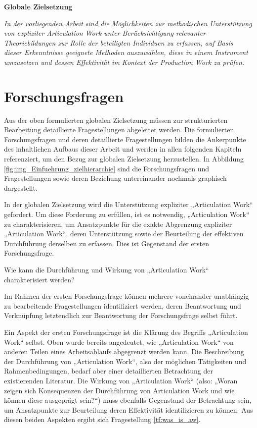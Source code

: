 \begin{framed}
	\label{zielsetzung}\textbf{Globale Zielsetzung} 
	
	\emph{In der vorliegenden Arbeit sind die Möglichkeiten zur methodischen Unterstützung von expliziter Articulation Work unter Berücksichtigung relevanter Theoriebildungen zur Rolle der beteiligten Individuen zu erfassen, auf Basis dieser Erkenntnisse geeignete Methoden auszuwählen, diese in einem Instrument umzusetzen und dessen Effektivität im Kontext der Production Work zu prüfen.}
\end{framed}


\section{Forschungsfragen} %
\label{sec:forschungsfragen}

Aus der oben formulierten globalen Zielsetzung müssen zur strukturierten Bearbeitung detaillierte Fragestellungen abgeleitet werden. Die formulierten Forschungsfragen und deren detaillierte Fragestellungen bilden die Ankerpunkte des inhaltlichen Aufbaus dieser Arbeit und werden in allen folgenden Kapiteln referenziert, um den Bezug zur globalen Zielsetzung herzustellen. In Abbildung \ref{fig:img_Einfuehrung_zielhierarchie} sind die Forschungsfragen und Fragestellungen sowie deren Beziehung untereinander nochmals graphisch dargestellt.

In der globalen Zielsetzung wird die Unterstützung expliziter „Articulation Work“ gefordert. Um diese Forderung zu erfüllen, ist es notwendig, „Articulation Work“ zu charakterisieren, um Ansatzpunkte für die exakte Abgrenzung expliziter „Articulation Work“, deren Unterstützung sowie der Beurteilung der effektiven Durchführung derselben zu erfassen. Dies ist Gegenstand der ersten Forschungsfrage. 

\begin{ff}
	\label{ff:beschreibung}
	Wie kann die Durchführung und Wirkung von „Articulation Work“ charakterisiert werden?
\end{ff}

Im Rahmen der ersten Forschungsfrage können mehrere voneinander unabhängig zu bearbeitende Fragestellungen identifiziert werden, deren Beantwortung und Verknüpfung letztendlich zur Beantwortung der Forschungsfrage selbst führt.

Ein Aspekt der ersten Forschungsfrage ist die Klärung des Begriffs „Articulation Work“ selbst. Oben wurde bereits angedeutet, wie „Articulation Work“ von anderen Teilen eines Arbeitsablaufs abgegrenzt werden kann. Die Beschreibung der Durchführung von „Articulation Work“, also der möglichen Tätigkeiten und Rahmenbedingungen, bedarf aber einer detaillierten Betrachtung der existierenden Literatur. Die Wirkung von „Articulation Work“ (also: „Woran zeigen sich Konsequenzen der Durchführung von Articulation Work und wie können diese ausgeprägt sein?“) muss ebenfalls Gegenstand der Betrachtung sein, um Ansatzpunkte zur Beurteilung deren Effektivität identifizieren zu können. Aus diesen beiden Aspekten ergibt sich Fragestellung \ref{tf:was_is_aw}.

